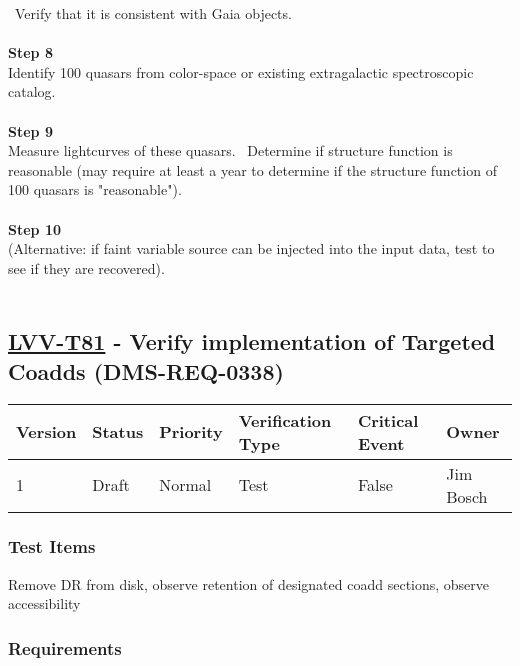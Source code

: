 ~Verify that it is consistent with Gaia objects.\\
~\\
\textbf{Step 8}\\
Identify 100 quasars from color-space or existing extragalactic
spectroscopic catalog.\\
~\\
\textbf{Step 9}\\
Measure lightcurves of these quasars. ~Determine if structure function
is reasonable (may require at least a year to determine if the structure
function of 100 quasars is "reasonable").\\
~\\
\textbf{Step 10}\\
(Alternative: if faint variable source can be injected into the input
data, test to see if they are recovered).\\
~\\

\hypertarget{lvv-t81---verify-implementation-of-targeted-coadds-dms-req-0338}{%
\subsection{\texorpdfstring{\href{https://jira.lsstcorp.org/secure/Tests.jspa\#/testCase/LVV-T81}{LVV-T81}
- Verify implementation of Targeted Coadds
(DMS-REQ-0338)}{LVV-T81 - Verify implementation of Targeted Coadds (DMS-REQ-0338)}}\label{lvv-t81---verify-implementation-of-targeted-coadds-dms-req-0338}}

\begin{longtable}[]{@{}llllll@{}}
\toprule
Version & Status & Priority & Verification Type & Critical Event &
Owner\tabularnewline
\midrule
\endhead
1 & Draft & Normal & Test & False & Jim Bosch\tabularnewline
\bottomrule
\end{longtable}

\hypertarget{test-items-57}{%
\subsubsection{Test Items}\label{test-items-57}}

​​​​Remove DR from disk, observe retention of designated coadd sections,
observe accessibility

\hypertarget{requirements-58}{%
\subsubsection{Requirements}\label{requirements-58}}

